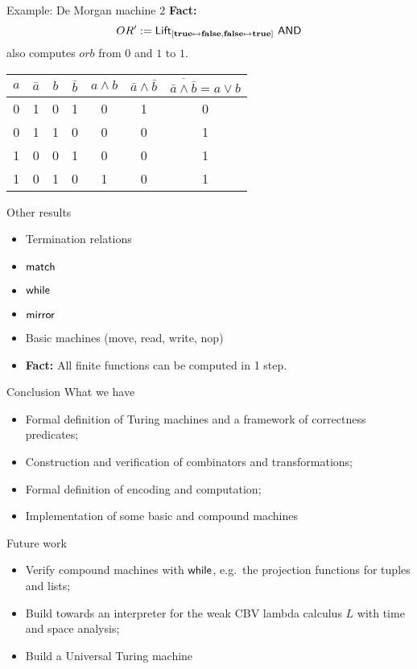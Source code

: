\begin{frame}{Example: De Morgan machine 2}
  \textbf{Fact:}
  \[
    OR' := \textsf{Lift}_{[\mathbf{true} \mapsto \mathbf{false}, \mathbf{false} \mapsto \mathbf{true}]}~\textsf{AND}
  \]
  also computes $orb$ from $0$ and $1$ to $1$.

  \pause%
  \begin{table}
    \begin{tabular}{|cc|cc|c|c|c|}
      \hline
      $a$ & $\bar{a}$ & $b$ & $\bar{b}$ & $a\land b$ & $\bar{a}\land\bar{b}$ & $\overline{\bar{a}\land\bar{b}}=a\lor b$\tabularnewline
      \hline
      0 & 1 & 0 & 1 & 0 & 1 & 0\tabularnewline
      0 & 1 & 1 & 0 & 0 & 0 & 1\tabularnewline
      1 & 0 & 0 & 1 & 0 & 0 & 1\tabularnewline
      1 & 0 & 1 & 0 & 1 & 0 & 1\tabularnewline
      \hline
    \end{tabular}
  \end{table}
\end{frame}

\begin{frame}{Other results}
  \begin{itemize}
    \item Termination relations
    \item $\textsf{match}$
    \item $\textsf{while}$
    \item $\textsf{mirror}$
    \item Basic machines (move, read, write, nop)
    \item \textbf{Fact:} All finite functions can be computed in 1 step.
  \end{itemize}
\end{frame}

\begin{frame}{Conclusion}
  What we have
  \begin{itemize}
    \item Formal definition of Turing machines and a framework of correctness predicates;
    \item Construction and verification of combinators and transformations;
    \item Formal definition of encoding and computation;
    \item Implementation of some basic and compound machines
  \end{itemize}

  Future work
  \begin{itemize}
    \item Verify compound machines with $\textsf{while}$, e.g.\ the projection functions for tuples and lists;
    \item Build towards an interpreter for the weak CBV lambda calculus $L$ with time and space analysis;
    \item Build a Universal Turing machine
  \end{itemize}
\end{frame}

